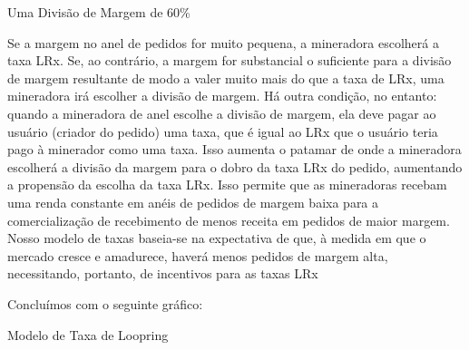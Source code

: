 \documentclass[UTF8,nofonts]{article}
\makeatletter
\newenvironment{figurehere}
 {\def\@captype{figure}}
 {}
\makeatother
\begin{document}
\begin{multicols}{2}
\begin{center}
\begin{figurehere}
\begin{tikzpicture}[
scale=1,
font=\bfseries\footnotesize\sffamily,
classical/.style={thick,<->,shorten >=2pt,shorten <=2pt,>=stealth},
oneway/.style={->,dashed,shorten >=2pt,shorten <=2pt,>=stealth}
]
\end{tikzpicture}
\caption{Uma Divisão de Margem de 60\%}
\label{fig:marginsplit}
\end{figurehere}
\end{center}


Se a margem no anel de pedidos for muito pequena, a mineradora escolherá a taxa LRx. Se, ao contrário, a margem for substancial o suficiente para a divisão de margem resultante de modo a valer muito mais do que a taxa de LRx, uma mineradora irá escolher a divisão de margem. Há outra condição, no entanto: quando a mineradora de anel escolhe a divisão de margem, ela deve pagar ao usuário (criador do pedido) uma taxa, que é igual ao LRx que o usuário teria pago à minerador como uma taxa. Isso aumenta o patamar de onde a mineradora escolherá a divisão da margem para o dobro da taxa LRx do pedido, aumentando a propensão da escolha da taxa LRx. Isso permite que as mineradoras recebam uma renda constante em anéis de pedidos de margem baixa para a comercialização de recebimento de menos receita em pedidos de maior margem. Nosso modelo de taxas baseia-se na expectativa de que, à medida em que o mercado cresce e amadurece, haverá menos pedidos de margem alta, necessitando, portanto, de incentivos para as taxas LRx 

Concluímos com o seguinte gráfico:

\begin{center}
\begin{figurehere}
\centering
{}
\caption{Modelo de Taxa de Loopring}
\label{fig:feemodel}
\end{figurehere}
\end{center}




\end{multicols}
\end{document}
